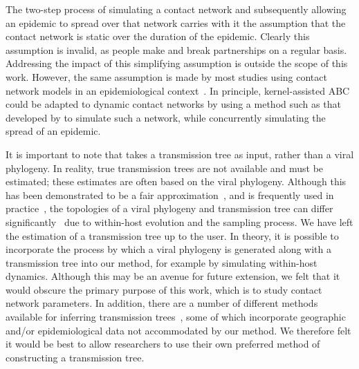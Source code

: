 
The two-step process of simulating a contact network and subsequently allowing
an epidemic to spread over that network carries with it the assumption that the
contact network is static over the duration of the epidemic. Clearly this
assumption is invalid, as people make and break partnerships on a regular
basis. Addressing the impact of this simplifying assumption is outside the
scope of this work. However, the same assumption is made by most studies using
contact network models in an epidemiological
context~\autocite{welch2011statistical, bansal2007individual}. In principle,
kernel-assisted \gls{ABC} could be adapted to dynamic contact networks by using a method
such as that developed by \textcite{robinson2012dynamics} to simulate such a
network, while concurrently simulating the spread of an epidemic.

It is important to note that  takes a transmission tree as
input, rather than a viral phylogeny. In reality, true transmission trees are
not available and must be estimated; these estimates are often based on the
viral phylogeny. Although this has been demonstrated to be a fair
approximation~\autocite[e.g.][]{leitner1996accurate}, and is frequently used in
practice~\autocite[e.g.][]{stadler2013uncovering}, the topologies of a viral
phylogeny and transmission tree can differ
significantly~\autocite{ypma2013relating, hall2015epidemic} due to within-host
evolution and the sampling process. We have left the estimation of a
transmission tree up to the user. In theory, it is possible to incorporate the
process by which a viral phylogeny is generated along with a transmission tree
into our method, for example by simulating within-host dynamics. Although this
may be an avenue for future extension, we felt that it would obscure the
primary purpose of this work, which is to study contact network parameters. In
addition, there are a number of different methods available for inferring
transmission trees~\autocite{didelot2014bayesian, ypma2012unravelling,
jombart2011reconstructing, cottam2008integrating, hall2015epidemic}, some of
which incorporate geographic and/or epidemiological data not accommodated by
our method. We therefore felt it would be best to allow researchers to use
their own preferred method of constructing a transmission tree.


